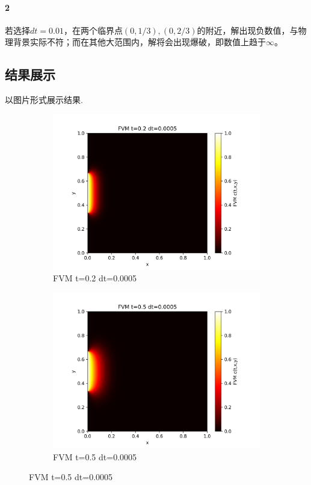 \documentclass[11pt,a4 paper,one side]{article}
\begin{document}
\paragraph{2} 若选择$dt=0.01$，在两个临界点$(0,1/3),(0,2/3)$的附近，解出现负数值，与物理背景实际不符；而在其他大范围内，解将会出现爆破，即数值上趋于$\infty$。
\subsection{结果展示}
以图片形式展示结果.\begin{figure}[htbp]
    \centering
    \begin{subfigure}{0.45\textwidth}
        \includegraphics[width=\textwidth]{FVM t=0.2 dt=0.0005.png}
        \caption{FVM t=0.2 dt=0.0005}
        \label{FVM t=0.2 dt=0.0005}
    \end{subfigure}
    \hfill
    \begin{subfigure}{0.45\textwidth}
        \includegraphics[width=\textwidth]{FVM t=0.5 dt=0.0005.png}
        \caption{FVM t=0.5 dt=0.0005}
        \label{FVM t=0.5 dt=0.0005}
    \end{subfigure}
    

\end{figure}
\end{document}
